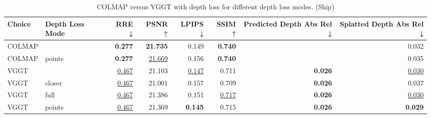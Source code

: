 \begin{table}[H]
\caption{COLMAP versus VGGT with depth loss for different depth loss modes. (Ship)}
\label{tab:05_depth_loss_mode_ship}
\begin{tabular}{llrrrrrr}
\toprule
Choice & Depth Loss Mode & RRE ↓ & PSNR ↑ & LPIPS ↓ & SSIM ↑ & Predicted Depth Abs Rel ↓ & Splatted Depth Abs Rel ↓ \\
\midrule
COLMAP &  & \textbf{0.277} & \textbf{21.735} & 0.149 & \textbf{0.740} &  & 0.032 \\
COLMAP & points & \textbf{0.277} & \underline{21.669} & 0.156 & \textbf{0.740} &  & 0.035 \\
VGGT &  & \underline{0.467} & 21.103 & \underline{0.147} & 0.711 & \textbf{0.026} & \underline{0.030} \\
VGGT & closer & \underline{0.467} & 21.001 & 0.157 & 0.709 & \textbf{0.026} & 0.037 \\
VGGT & full & \underline{0.467} & 21.386 & 0.151 & \underline{0.717} & \textbf{0.026} & \underline{0.030} \\
VGGT & points & \underline{0.467} & 21.369 & \textbf{0.145} & 0.715 & \textbf{0.026} & \textbf{0.029} \\
\bottomrule
\end{tabular}
\end{table}
